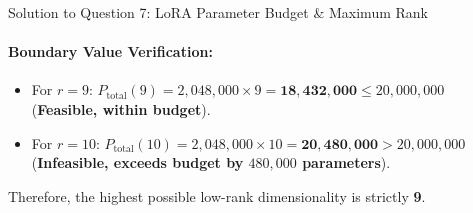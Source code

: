 \documentclass[11pt,a4paper]{article}
\begin{document}
\begin{solutionbox}{Solution to Question 7: LoRA Parameter Budget \& Maximum Rank}
\paragraph{Boundary Value Verification:}
\begin{itemize}[noitemsep]
    \item For $r = 9$: $P_{\text{total}}(9) = 2{,}048{,}000 \times 9 = \mathbf{18{,}432{,}000} \le 20{,}000{,}000$ (\textbf{Feasible, within budget}).
    \item For $r = 10$: $P_{\text{total}}(10) = 2{,}048{,}000 \times 10 = \mathbf{20{,}480{,}000} > 20{,}000{,}000$ (\textbf{Infeasible, exceeds budget by $480{,}000$ parameters}).
\end{itemize}
Therefore, the highest possible low-rank dimensionality is strictly \textbf{9}.
\end{solutionbox}

\vspace{0.4cm}
\end{document}
